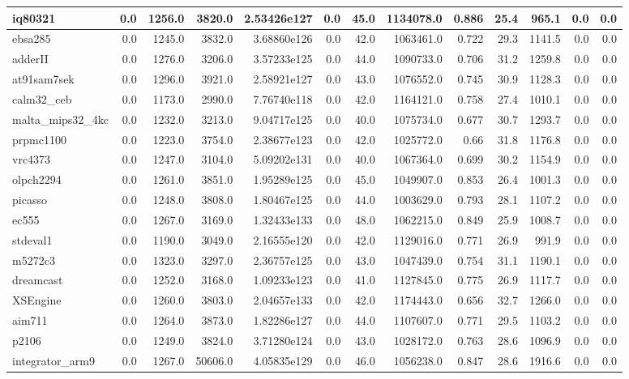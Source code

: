 \begin{tabular}{|l r r r r| r r r r r r | r r|}
\hline
iq80321 & 0.0 & 1256.0 & 3820.0 & 2.53426e127 & 0.0 & 45.0 & 1134078.0 & 0.886 & 25.4 & 965.1 & 0.0 & 0.0 \\
\hline
ebsa285 & 0.0 & 1245.0 & 3832.0 & 3.68860e126 & 0.0 & 42.0 & 1063461.0 & 0.722 & 29.3 & 1141.5 & 0.0 & 0.0 \\
\hline
adderII & 0.0 & 1276.0 & 3206.0 & 3.57233e125 & 0.0 & 44.0 & 1090733.0 & 0.706 & 31.2 & 1259.8 & 0.0 & 0.0 \\
\hline
at91sam7sek & 0.0 & 1296.0 & 3921.0 & 2.58921e127 & 0.0 & 43.0 & 1076552.0 & 0.745 & 30.9 & 1128.3 & 0.0 & 0.0 \\
\hline
calm32\_ceb & 0.0 & 1173.0 & 2990.0 & 7.76740e118 & 0.0 & 42.0 & 1164121.0 & 0.758 & 27.4 & 1010.1 & 0.0 & 0.0 \\
\hline
malta\_mips32\_4kc & 0.0 & 1232.0 & 3213.0 & 9.04717e125 & 0.0 & 40.0 & 1075734.0 & 0.677 & 30.7 & 1293.7 & 0.0 & 0.0 \\
\hline
prpmc1100 & 0.0 & 1223.0 & 3754.0 & 2.38677e123 & 0.0 & 42.0 & 1025772.0 & 0.66 & 31.8 & 1176.8 & 0.0 & 0.0 \\
\hline
vrc4373 & 0.0 & 1247.0 & 3104.0 & 5.09202e131 & 0.0 & 40.0 & 1067364.0 & 0.699 & 30.2 & 1154.9 & 0.0 & 0.0 \\
\hline
olpch2294 & 0.0 & 1261.0 & 3851.0 & 1.95289e125 & 0.0 & 45.0 & 1049907.0 & 0.853 & 26.4 & 1001.3 & 0.0 & 0.0 \\
\hline
picasso & 0.0 & 1248.0 & 3808.0 & 1.80467e125 & 0.0 & 44.0 & 1003629.0 & 0.793 & 28.1 & 1107.2 & 0.0 & 0.0 \\
\hline
ec555 & 0.0 & 1267.0 & 3169.0 & 1.32433e133 & 0.0 & 48.0 & 1062215.0 & 0.849 & 25.9 & 1008.7 & 0.0 & 0.0 \\
\hline
stdeval1 & 0.0 & 1190.0 & 3049.0 & 2.16555e120 & 0.0 & 42.0 & 1129016.0 & 0.771 & 26.9 & 991.9 & 0.0 & 0.0 \\
\hline
m5272c3 & 0.0 & 1323.0 & 3297.0 & 2.36757e125 & 0.0 & 43.0 & 1047439.0 & 0.754 & 31.1 & 1190.1 & 0.0 & 0.0 \\
\hline
dreamcast & 0.0 & 1252.0 & 3168.0 & 1.09233e123 & 0.0 & 41.0 & 1127845.0 & 0.775 & 26.9 & 1117.7 & 0.0 & 0.0 \\
\hline
XSEngine & 0.0 & 1260.0 & 3803.0 & 2.04657e133 & 0.0 & 42.0 & 1174443.0 & 0.656 & 32.7 & 1266.0 & 0.0 & 0.0 \\
\hline
aim711 & 0.0 & 1264.0 & 3873.0 & 1.82286e127 & 0.0 & 44.0 & 1107607.0 & 0.771 & 29.5 & 1103.2 & 0.0 & 0.0 \\
\hline
p2106 & 0.0 & 1249.0 & 3824.0 & 3.71280e124 & 0.0 & 43.0 & 1028172.0 & 0.763 & 28.6 & 1096.9 & 0.0 & 0.0 \\
\hline
integrator\_arm9 & 0.0 & 1267.0 & 50606.0 & 4.05835e129 & 0.0 & 46.0 & 1056238.0 & 0.847 & 28.6 & 1916.6 & 0.0 & 0.0 \\
\hline
\end{tabular}